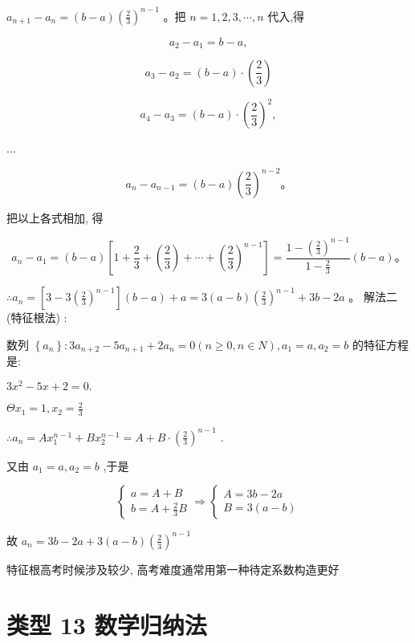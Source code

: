 \documentclass[10pt,cn]{elegantbook}
\begin{document}
\({a}_{n + 1} - {a}_{n} = \left( {b - a}\right) {\left( \frac{2}{3}\right) }^{n - 1}\) 。把 \(n = 1,2,3,\cdots ,n\) 代入,得

\[
{a}_{2} - {a}_{1} = b - a,
\]

\[
{a}_{3} - {a}_{2} = \left( {b - a}\right) \cdot \left( \frac{2}{3}\right)
\]

\[
{a}_{4} - {a}_{3} = \left( {b - a}\right) \cdot {\left( \frac{2}{3}\right) }^{2},
\]

...

\[
{a}_{n} - {a}_{n - 1} = \left( {b - a}\right) {\left( \frac{2}{3}\right) }^{n - 2}\text{。}
\]

把以上各式相加, 得

\[
{a}_{n} - {a}_{1} = \left( {b - a}\right) \left\lbrack {1 + \frac{2}{3} + \left( \frac{2}{3}\right) + \cdots + {\left( \frac{2}{3}\right) }^{n - 1}}\right\rbrack = \frac{1 - {\left( \frac{2}{3}\right) }^{n - 1}}{1 - \frac{2}{3}}\left( {b - a}\right) 。
\]

\(\therefore {a}_{n} = \left\lbrack {3 - 3{\left( \frac{2}{3}\right) }^{n - 1}}\right\rbrack \left( {b - a}\right) + a = 3\left( {a - b}\right) {\left( \frac{2}{3}\right) }^{n - 1} + {3b} - {2a}\) 。 解法二 (特征根法) :

数列 \(\left\{ {a}_{n}\right\} : 3{a}_{n + 2} - 5{a}_{n + 1} + 2{a}_{n} = 0\left( {n \geq 0,n \in N}\right) ,{a}_{1} = a,{a}_{2} = b\) 的特征方程是:

\(3{x}^{2} - {5x} + 2 = 0.\)

\(\Theta {x}_{1} = 1,{x}_{2} = \frac{2}{3}\)

\(\therefore {a}_{n} = A{x}_{1}^{n - 1} + B{x}_{2}^{n - 1} = A + B \cdot {\left( \frac{2}{3}\right) }^{n - 1}\) .

又由 \({a}_{1} = a,{a}_{2} = b\) ,于是

\[
\left\{ {\begin{array}{l} a = A + B \\ b = A + \frac{2}{3}B \end{array} \Rightarrow \left\{ \begin{array}{l} A = {3b} - {2a} \\ B = 3\left( {a - b}\right) \end{array}\right. }\right.
\]

故 \({a}_{n} = {3b} - {2a} + 3\left( {a - b}\right) {\left( \frac{2}{3}\right) }^{n - 1}\)

特征根高考时候涉及较少, 高考难度通常用第一种待定系数构造更好

\section*{类型 13 数学归纳法}
\end{document}

